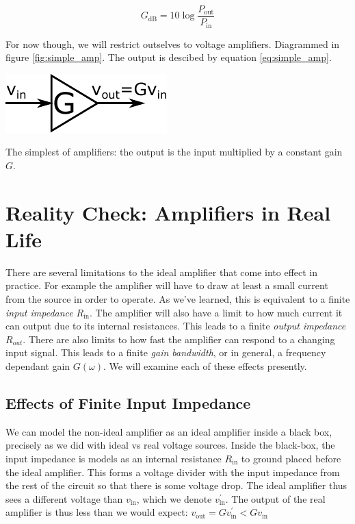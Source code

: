 \documentclass{tufte-book}
\begin{document}
\begin{equation}
\label{eq:power_amp_dB}
G_\text{dB} = 10\log\frac{P_\text{out}}{P_\text{in}} 
\end{equation}

\noindent For now though, we will restrict outselves to voltage amplifiers. Diagrammed in figure \ref{fig:simple_amp}. The output is descibed by equation \ref{eq:simple_amp}.

\begin{marginfigure}%
  \includegraphics[width=\linewidth]{SimpleAmplifier}
  \caption{The simplest of amplifiers: the output is the input multiplied by a constant gain $G$.}
  \label{fig:simple_amp}
\end{marginfigure}

\section{Reality Check: Amplifiers in Real Life}
There are several limitations to the ideal amplifier that come into effect in practice. For example the amplifier will have to draw at least a small current from the source in order to operate. As we've learned, this is equivalent to a finite \textit{input impedance} $R_\text{in}$. The amplifier will also have a limit to how much current it can output due to its internal resistances. This leads to a finite \textit{output impedance} $R_{out}$. There are also limits to how fast the amplifier can respond to a changing input signal. This leads to a finite \textit{gain bandwidth}, or in general, a frequency dependant gain $G(\omega)$. We will examine each of these effects presently.

\subsection{Effects of Finite Input Impedance}
\label{sec:AMP_effect_input}
We can model the non-ideal amplifier as an ideal amplifier inside a black box, precisely as we did with ideal vs real voltage sources. Inside the black-box, the input impedance is models as an internal resistance $R_\text{in}$ to ground placed before the ideal amplifier. This forms a voltage divider with the input impedance from the rest of the circuit so that there is some voltage drop. The ideal amplifier thus sees a different voltage than $v_\text{in}$, which we denote $v^\prime_\text{in}$. The output of the real amplifier is thus less than we would expect: $v_\text{out} = Gv^\prime_\text{in} < Gv_\text{in}$
\end{document}
